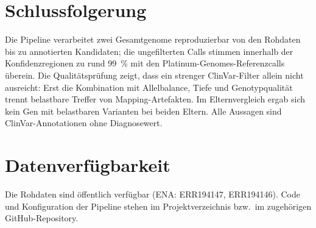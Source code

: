 \documentclass[10pt,a4paper,twocolumn]{article}
\begin{document}
\section{Schlussfolgerung}
Die Pipeline verarbeitet zwei Gesamtgenome reproduzierbar von den Rohdaten bis zu annotierten Kandidaten; die ungefilterten Calls stimmen innerhalb der Konfidenzregionen zu rund 99~\% mit den Platinum-Genomes-Referenzcalls \"uberein. Die Qualit\"atspr\"ufung zeigt, dass ein strenger ClinVar-Filter allein nicht ausreicht: Erst die Kombination mit Allelbalance, Tiefe und Genotypqualit\"at trennt belastbare Treffer von Mapping-Artefakten. Im Elternvergleich ergab sich kein Gen mit belastbaren Varianten bei beiden Eltern. Alle Aussagen sind ClinVar-Annotationen ohne Diagnosewert.

\section*{Datenverf\"ugbarkeit}
Die Rohdaten sind \"offentlich verf\"ugbar (ENA: ERR194147, ERR194146). Code und Konfiguration der Pipeline stehen im Projektverzeichnis bzw.\ im zugeh\"origen GitHub-Repository.



\end{document}
